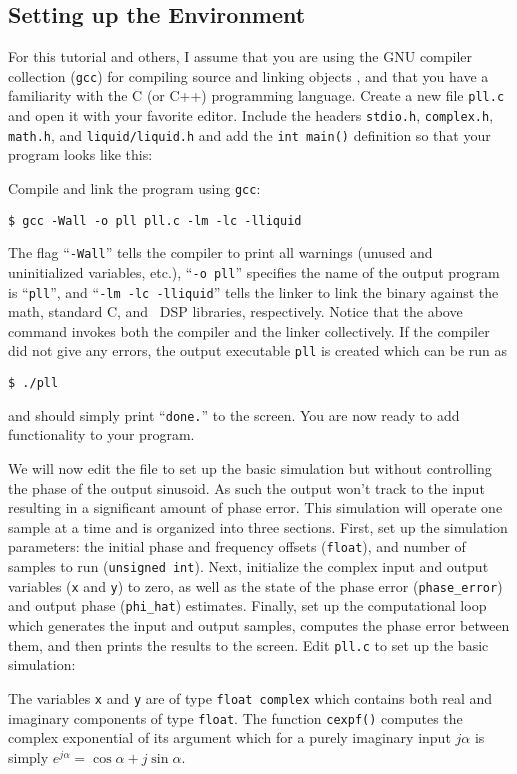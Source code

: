 \subsection{Setting up the Environment}
\label{tutorial:pll:environment}

For this tutorial and others, I assume that you are using the GNU
compiler collection ({\tt gcc}) for compiling source and linking objects
\cite{gcc:web},
and that you have a familiarity with the C (or C++) programming
language.
Create a new file {\tt pll.c} and open it with your favorite editor.
Include the headers {\tt stdio.h}, {\tt complex.h}, {\tt math.h}, and
{\tt liquid/liquid.h} and add the {\tt int main()} definition
so that your program looks like this:
%

%
Compile and link the program using {\tt gcc}:
%
\begin{Verbatim}[fontsize=\small]
    $ gcc -Wall -o pll pll.c -lm -lc -lliquid
\end{Verbatim}
%
The flag ``{\tt -Wall}'' tells the compiler to print all warnings
(unused and uninitialized variables, etc.),
``{\tt -o pll}'' specifies the name of the output program is
``{\tt pll}'', and
``{\tt -lm -lc -lliquid}'' tells the linker to link the binary against
the math, standard C, and \liquid\ DSP libraries, respectively.
Notice that the above command invokes both the compiler and the linker
collectively.
%
If the compiler did not give any errors, the output executable {\tt pll}
is created which can be run as
\begin{Verbatim}[fontsize=\small]
    $ ./pll
\end{Verbatim}
%
and should simply print ``{\tt done.}'' to the screen.
You are now ready to add functionality to your program.

We will now edit the file to set up the basic simulation but without
controlling the phase of the output sinusoid.
As such the output won't track to the input resulting in a significant
amount of phase error.
This simulation will operate one sample at a time and is organized into
three sections.
First, set up the simulation parameters: the initial phase and frequency
offsets ({\tt float}),
and number of samples to run ({\tt unsigned int}).
Next, initialize the complex input and output variables
({\tt x} and {\tt y}) to zero,
as well as the state of the phase error ({\tt phase\_error})
and output phase ({\tt phi\_hat}) estimates.
Finally, set up the computational loop which generates the input and
output samples, computes the phase error between them, and then prints
the results to the screen.
%
Edit {\tt pll.c} to set up the basic simulation:
%

%
The variables {\tt x} and {\tt y} are of type {\tt float complex} which
contains both real and imaginary components of type {\tt float}.
The function {\tt cexpf()} computes the complex exponential of its
argument which for a purely imaginary input $j\alpha$ is simply
$e^{j\alpha} = \cos\alpha + j\sin\alpha$.

